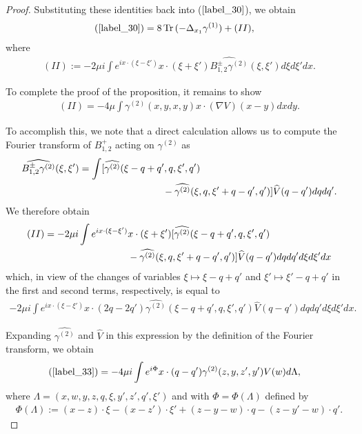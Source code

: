 \documentclass[reqno]{amsart}
\numberwithin{equation}{section}
\theoremstyle{remark}
\DeclareMathOperator{\Tr}{Tr\,}
\begin{document}
\begin{proof}
Substituting these identities back into ($\ref{label_30}$), we obtain
\begin{align*}
(\ref{label_30})&=8\Tr(-\Delta_{x_1}\gamma^{(1)})+(II),
\end{align*}
where
\begin{align*}
(II):=-2\mu i\int e^{ix\cdot (\xi-\xi')}x\cdot (\xi+\xi')\widehat{B^\pm_{1,2}\gamma^{(2)}}(\xi,\xi')d\xi d\xi' dx.
\end{align*}

To complete the proof of the proposition, it remains to show 
\begin{align}
(II)=-4\mu \int \gamma^{(2)}(x,y,x,y)x\cdot (\nabla V)(x-y)dxdy.\label{label_32}
\end{align}

To accomplish this, we note that a direct calculation allows us to compute the Fourier transform of $B^+_{1,2}$ acting on $\gamma^{(2)}$ as
\begin{align*}
\widehat{B^{\pm}_{1,2}\gamma^{(2)}}(\xi,\xi')&=\int [\widehat{\gamma^{(2)}}(\xi-q+q',q,\xi',q')\\
&\hspace{1.2in}-\widehat{\gamma^{(2)}}(\xi,q,\xi'+q-q',q')]\widehat{V}(q-q')dq dq'.
\end{align*}
We therefore obtain
\begin{align*}
(II)&=-2\mu i\int e^{ix\cdot (\xi-\xi')}x\cdot (\xi+\xi') [\widehat{\gamma^{(2)}}(\xi-q+q',q,\xi',q')\\
&\hspace{1.2in}-\widehat{\gamma^{(2)}}(\xi,q,\xi'+q-q',q')]\widehat{V}(q-q')dqdq' d\xi d\xi' dx
\end{align*}
which, in view of the changes of variables $\xi\mapsto \xi-q+q'$ and $\xi'\mapsto \xi'-q+q'$ in the first and second terms, respectively, is equal to
\begin{align}
-2\mu i\int e^{ix\cdot (\xi-\xi')}x\cdot (2q-2q')\widehat{\gamma^{(2)}}(\xi-q+q',q,\xi',q')\widehat{V}(q-q') dq dq' d\xi d\xi' dx.\label{label_33}
\end{align}

Expanding $\widehat{\gamma^{(2)}}$ and $\widehat{V}$ in this expression by the definition of the Fourier transform, we obtain
\begin{align*}
(\ref{label_33})&=-4\mu i\int e^{i\Phi}x\cdot (q-q')\gamma^{(2)}(z,y,z',y')V(w) d\Lambda,
\end{align*}
where $\Lambda=(x,w,y,z,q,\xi,y',z',q',\xi')$ and with $\Phi=\Phi(\Lambda)$ defined by
\begin{align*}
\Phi(\Lambda):=(x-z)\cdot \xi-(x-z')\cdot \xi'+(z-y-w)\cdot q-(z-y'-w)\cdot q'.
\end{align*}


\end{proof}
\end{document}
